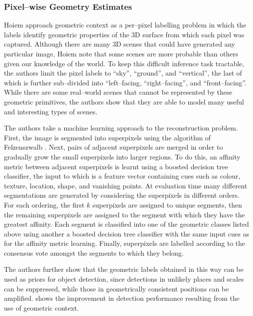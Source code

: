 \subsubsection{Pixel--wise Geometry Estimates}

Hoiem \etal \cite{Hoiem06} approach geometric context as a per--pixel
labelling problem in which the labels identify geometric properties of
the 3D surface from which each pixel was captured. Although there are
many 3D scenes that could have generated any particular image, Hoiem
\etal note that some scenes are more probable than others given our
knowledge of the world. To keep this difficult inference task
tractable, the authors limit the pixel labels to ``sky'', ``ground'',
and ``vertical'', the last of which is further sub--divided into
``left--facing, ``right--facing'', and ``front--facing''. While there
are some real--world scenes that cannot be represented by these
geometric primitives, the authors show that they are able to model
many useful and interesting types of scenes.

The authors take a machine learning approach to the reconstruction
problem. First, the image is segmented into superpixels using the
algorithm of Felzenszwalb \etal \cite{Felzenszwalb04}. Next, pairs of
adjacent superpixels are merged in order to gradually grow the small
superpixels into larger regions. To do this, an affinity metric
between adjacent superpixels is learnt using a boosted decision tree
classifier, the input to which is a feature vector containing cues
such as colour, texture, location, shape, and vanishing points. At
evaluation time many different segmentations are generated by
considering the superpixels in different orders. For each ordering,
the first $k$ superpixels are assigned to unique segments, then the
remaining superpixels are assigned to the segment with which they have
the greatest affinity. Each segment is classified into one of the
geometric classes listed above using another a boosted decision tree
classifier with the same input cues as for the affinity metric
learning. Finally, superpixels are labelled according to the consensus
vote amongst the segments to which they belong.

The authors further show that the geometric labels obtained in this
way can be used as priors for object detection, since detections in
unlikely places and scales can be suppressed, while those in
geometrically consistent positions can be
amplified.  shows the improvement in detection
performance resulting from the use of geometric context.

